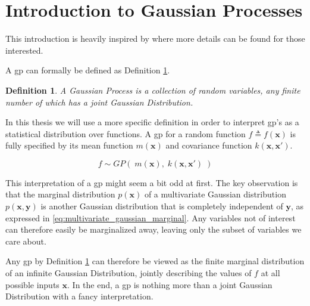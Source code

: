 \section{Introduction to Gaussian Processes}

This introduction is heavily inspired by \cite{rasmussen} where more details can be found for those interested. 

A \acrfull{gp} can formally be defined as Definition \ref{def:gp}.

\newtheorem{gp_def}{Definition}
\begin{gp_def}\label{def:gp}
A Gaussian Process is a collection of random variables, any finite number of which has a joint Gaussian Distribution.
\end{gp_def}

In this thesis we will use a more specific definition in order to interpret \acrshort{gp}'s as a statistical distribution over functions. A \acrshort{gp} for a random function $f \triangleq f(\boldsymbol{x})$ is fully specified by its mean function $m(\boldsymbol{x})$ and covariance function $k(\boldsymbol{x}, \boldsymbol{x}')$.

\begin{equation}\label{eq:gp}
    f \sim GP(\;m(\boldsymbol{x}), \; k(\boldsymbol{x}, \boldsymbol{x}')\;)
\end{equation}

This interpretation of a \acrshort{gp} might seem a bit odd at first. The key observation is that the marginal distribution $p(\boldsymbol{x})$ of a multivariate Gaussian distribution $p(\boldsymbol{x}, \boldsymbol{y})$ is another Gaussian distribution that is completely independent of $\boldsymbol{y}$, as expressed in \cref{eq:multivariate_gaussian_marginal}. Any variables not of interest can therefore easily be marginalized away, leaving only the subset of variables we care about.

Any \acrshort{gp} by Definition \ref{def:gp} can therefore be viewed as the finite marginal distribution of an infinite Gaussian Distribution, jointly describing the values of $f$ at all possible inputs $\boldsymbol{x}$. In the end, a \acrshort{gp} is nothing more than a joint Gaussian Distribution with a fancy interpretation.

